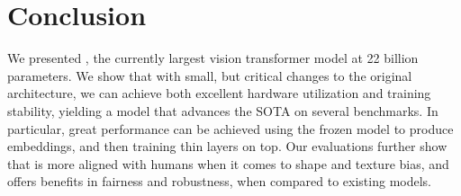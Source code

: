 \section{Conclusion}
\label{sec:conclusion}
We presented \chonk, the currently largest  vision transformer model at 22 billion parameters.
We show that with small, but critical changes to the original architecture, we can achieve both excellent hardware utilization and training stability, yielding a model that advances the SOTA on several benchmarks.
In particular, great performance can be achieved using the frozen model to produce embeddings, and then training thin layers on top.
Our evaluations further show that \chonk is more aligned with humans when it comes to shape and texture bias, and offers benefits in fairness and robustness, when compared to existing models.



